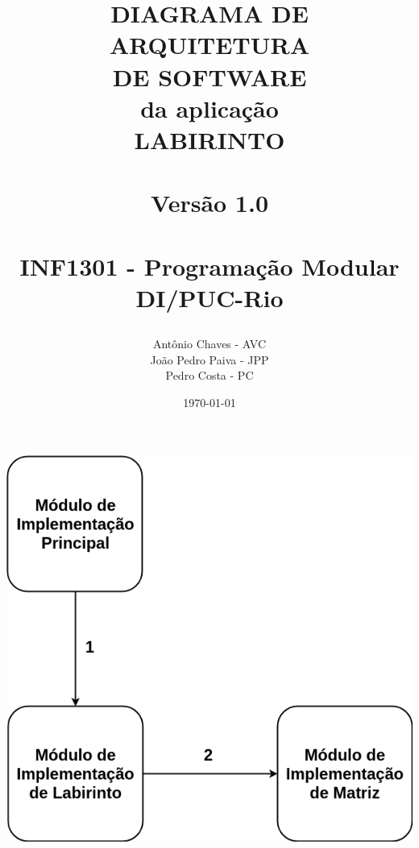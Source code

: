 \documentclass[a4paper,12pt,oneside]{book}
\title{
  \begin{flushright}
  \Huge{DIAGRAMA DE ARQUITETURA\\ DE SOFTWARE}\\
  da aplicação\\
  LABIRINTO\\
  ~\\
  \LARGE{Versão 1.0}\\
  ~\\
  INF1301 - Programação Modular\\ DI/PUC-Rio
  \end{flushright}
}
\author{Antônio Chaves - AVC\\João Pedro Paiva - JPP\\Pedro Costa - PC}
\date{\today}
\begin{document}
\frontmatter
\maketitle




\mainmatter

\begin{center}

    \includegraphics[width=1\textwidth]{arquitetura.png}
    
\end{center}
\end{document}
